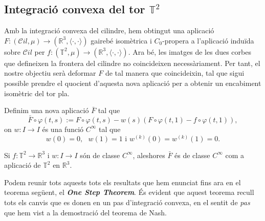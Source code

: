 \subsection{Integració convexa del tor $\mathbb T^2$}
Amb la integració convexa del cilindre, hem obtingut una aplicació $F:(\mathcal Cil, \mu)\to(\mathbb R^3, \langle\cdot, \cdot\rangle)$ gairebé isomètrica i $C_0$-propera a l'aplicació induïda sobre $\mathcal Cil$ per $f:(\mathbb T^2, \mu)\to(\mathbb R^3, \langle\cdot, \cdot\rangle)$. Ara bé, les imatges de les dues corbes que defineixen la frontera del cilindre no coincideixen necessàriament. Per tant, el nostre objectiu serà deformar $F$ de tal manera que coincideixin, tal que sigui possible prendre el quocient d'aquesta nova aplicació per a obtenir un encabiment isomètric del tor pla.

Definim una nova aplicació $\bar F$ tal que
\begin{equation}
    \label{eq:def_barF}
    \bar F\circ\varphi(t,s) := F\circ\varphi(t,s) - w(s)(F\circ\varphi(t,1)-f\circ\varphi(t,1)),
\end{equation}
on $w:I\to I$ és una funció $C^\infty$ tal que 
\begin{equation*}
    w(0)=0, \text{ } w(1)=1 \text{ i } w^{(k)}(0)=w^{(k)}(1)=0.
\end{equation*}
\begin{lema}
    \label{lema:lema8}
    Si $f:\mathbb T^2\to\mathbb R^3$ i $w:I\to I$ són de classe $C^\infty$, aleshores $\bar F$ és de classe $C^\infty$ com a aplicació de $\mathbb T^2$ en $\mathbb R^3$.
\end{lema}
Podem reunir tots aquests tots els resultats que hem enunciat fins ara en el teorema següent, el \textbf{\textit{One Step Theorem}}. És evident que aquest teorema recull tots els canvis que es donen en un pas d'integració convexa, en el sentit de \textit{pas} que hem vist a la demostració del teorema de Nash.
